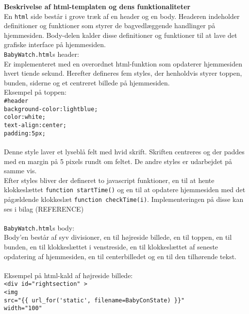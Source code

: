 \textbf{Beskrivelse af html-templaten og dens funktionaliteter} \\
En \verb+html+ side består i grove træk af en header og en body. Headeren indeholder definitioner og funktioner som styrer de bagvedlæggende handlinger på hjemmesiden. Body-delen kalder disse definitioner og funktioner til at lave det grafiske interface på hjemmesiden. 
\vspace{1mm} \\
\verb+BabyWatch.html+s header: \\ 
Er implementeret med en overordnet html-funktion som opdaterer hjemmesiden hvert tiende sekund. Herefter defineres fem styles, der henholdvis styrer toppen, bunden, siderne og et centreret billede på hjemmesiden. \\ Eksempel på toppen:  \\
\verb+#header+ \\
    \verb+background-color:lightblue;+\\
    \verb+color:white;+\\
    \verb+text-align:center;+\\
    \verb+padding:5px;+\\
\\Denne style laver et lyseblå felt med hvid skrift. Skriften centreres og der paddes med en margin på 5 pixels rundt om feltet. De andre styles er udarbejdet på samme vis.\\
Efter styles bliver der defineret to javascript funktioner, en til at hente klokkeslættet \verb+function startTime()+ og en til at opdatere hjemmesiden med det pågældende klokkeslæt \verb+function checkTime(i)+. Implementeringen på disse kan ses i bilag (REFERENCE)\vspace{2mm}\\
\\ \verb+BabyWatch.html+s body: \\ 
Body'en består af syv divisioner, en til højreside billede, en til toppen, en til bunden, en til klokkeslættet i venstreside, en til klokkeslættet af seneste opdatering af hjemmesiden, en til centerbilledet og en til den tilhørende tekst.\\
\\Eksempel på html-kald af højreside billede: \\
\verb+<div id="rightsection" >+\\
\verb+<img +\\
\verb+src="{{ url_for('static', filename=BabyConState) }}"+\\
\verb+width="100"+\\
